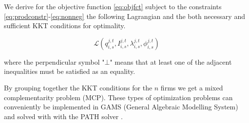 We derive for the objective function \eqref{eq:objfct} subject to the constraints \eqref{eq:prodconstr}-\eqref{eq:nonneg} the following Lagrangian and the both necessary and sufficient KKT conditions for optimality.

\begin{equation}
  \label{eq:kkt1}
  \mathcal{L}(q_{i,s}^{j,t}, I_{i,s}^{j,t},\lambda_{i,s}^{j,t},\phi_{i,s}^{j,t})
\end{equation}

where the perpendicular symbol "$\bot$" means that at least one of the adjacent inequalities must be satisfied as an equality.



By grouping together the KKT conditions for the $n$ firms we get a mixed complementarity problem (MCP). These types of optimization problems can conveniently be implemented in GAMS (General Algebraic Modelling System) and solved with with the PATH solver \citep[see][]{Ferris2000}.

